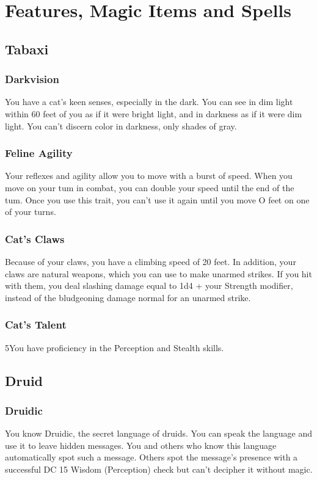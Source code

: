 \documentclass[a4paper,openany,twocolumn]{book}
\begin{document}

\pagebreak

\chapter*{Features, Magic Items and Spells}

\section*{Tabaxi}
\subsection{Darkvision}
You have a cat's keen senses, especially in the dark. You can see in dim light
within 60 feet of you as if it were bright light, and in darkness as if it were
dim light. You can't discern color in darkness, only shades of gray.
\subsection{Feline Agility}
Your reflexes and agility allow you to
move with a burst of speed. When you move on your
tum in combat, you can double your speed until the end
of the tum. Once you use this trait, you can't use it again
until you move O feet on one of your turns.
\subsection{Cat's Claws}
Because of your claws, you have a climbing speed of 20 feet. In addition, your
claws are natural weapons, which you can use to make unarmed strikes.  If you
hit with them, you deal slashing damage equal to 1d4 + your Strength modifier,
instead of the bludgeoning damage normal for an unarmed strike.
\subsection{Cat's Talent}
5You have proficiency in the Perception and Stealth skills.
\section*{Druid}
\subsection*{Druidic}
You know Druidic, the secret language of druids. You can speak the language and
use it to leave hidden messages. You and others who know this language
automatically spot such a message. Others spot the message's presence with a
successful DC 15 Wisdom (Perception) check but can't decipher it without magic.
\end{document}

